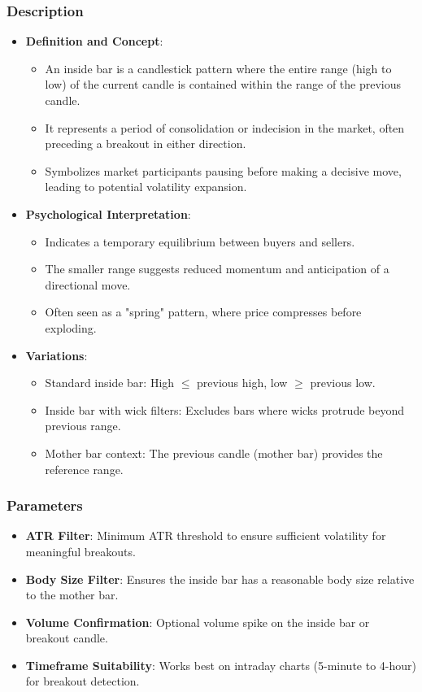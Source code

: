 \documentclass[12pt]{article}
\begin{document}
\subsubsection{Description}
\begin{itemize}
\item \textbf{Definition and Concept}:
  \begin{itemize}
  \item An inside bar is a candlestick pattern where the entire range (high to low) of the current candle is contained within the range of the previous candle.
  \item It represents a period of consolidation or indecision in the market, often preceding a breakout in either direction.
  \item Symbolizes market participants pausing before making a decisive move, leading to potential volatility expansion.
  \end{itemize}
\item \textbf{Psychological Interpretation}:
  \begin{itemize}
  \item Indicates a temporary equilibrium between buyers and sellers.
  \item The smaller range suggests reduced momentum and anticipation of a directional move.
  \item Often seen as a "spring" pattern, where price compresses before exploding.
  \end{itemize}
\item \textbf{Variations}:
  \begin{itemize}
  \item Standard inside bar: High $\leq$ previous high, low $\geq$ previous low.
  \item Inside bar with wick filters: Excludes bars where wicks protrude beyond previous range.
  \item Mother bar context: The previous candle (mother bar) provides the reference range.
  \end{itemize}
\end{itemize}

\subsubsection{Parameters}
\begin{itemize}
\item \textbf{ATR Filter}: Minimum ATR threshold to ensure sufficient volatility for meaningful breakouts.
\item \textbf{Body Size Filter}: Ensures the inside bar has a reasonable body size relative to the mother bar.
\item \textbf{Volume Confirmation}: Optional volume spike on the inside bar or breakout candle.
\item \textbf{Timeframe Suitability}: Works best on intraday charts (5-minute to 4-hour) for breakout detection.
\end{itemize}
\end{document}
